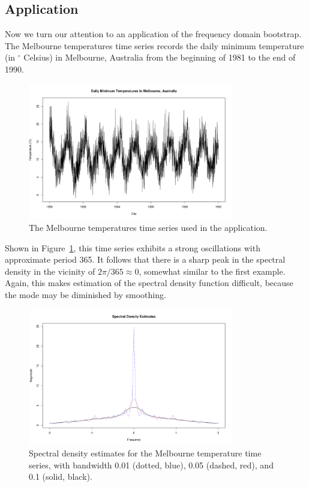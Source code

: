 \subsection*{Application}
Now we turn our attention to an application of the frequency domain bootstrap.
The Melbourne temperatures time series \cite{melbourne} records the daily 
minimum temperature (in $\phantom{}^\circ$ Celsius) in Melbourne,
Australia from the beginning of 1981 to the end of 1990.
    \begin{figure}[ht]
    \centering
    \includegraphics[width = 0.8\textwidth]{../res/exA.png}
    \caption{
        The Melbourne temperatures time series used in the application.
        }
    \label{exA}
    \end{figure}
Shown in Figure~\ref{exA}, this time series exhibits a strong oscillations with
approximate period 365.
It follows that there is a sharp peak in the spectral density in the
vicinity of $2\pi / 365 \approx 0$, somewhat similar to the first example.
Again, this makes estimation of the spectral density function difficult,
because the mode may be diminished by smoothing.
    \begin{figure}[hb]
    \centering
    \includegraphics[width = 0.8\textwidth]{../res/exA_spec.png}
    \caption{
        Spectral density estimates for the Melbourne temperature time series,
        with bandwidth 0.01 (dotted, blue), 0.05 (dashed, red), and 0.1
        (solid, black).
        }
    \label{exA_spec}
    \end{figure}


